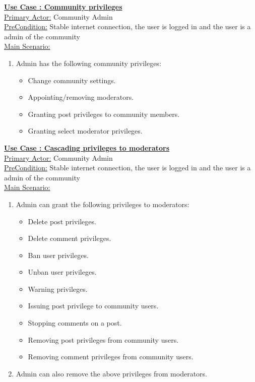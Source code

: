 \documentclass[conference,compsoc]{IEEEtran}
\newcounter{UC}
\newcommand{\nextU}{\stepcounter{UC}\theUC}
\begin{document}
\underline{\textbf{Use Case \nextU: Community privileges}}\\

\underline{Primary Actor:} Community Admin\\

\underline{PreCondition:} Stable internet connection, the user is logged in and the user is a admin of the community\\

\underline{Main Scenario:}\\
\begin{enumerate}
    \item Admin has the following community privileges:
          \begin{itemize}
              \item Change community settings.
              \item Appointing/removing moderators.
              \item Granting post privileges to community members.
              \item Granting select moderator privileges.
          \end{itemize}
\end{enumerate}

\underline{\textbf{Use Case \nextU: Cascading privileges to moderators}}\\

\underline{Primary Actor:} Community Admin\\

\underline{PreCondition:} Stable internet connection, the user is logged in and the user is a admin of the community\\

\underline{Main Scenario:}\\

\begin{enumerate}
    \item Admin can grant the following privileges to moderators:
          \begin{itemize}
              \item Delete post privileges.
              \item Delete comment privileges.
              \item Ban user privileges.
              \item Unban user privileges.
              \item Warning privileges.
              \item Issuing post privilege to community users.
              \item Stopping comments on a post.
              \item Removing post privileges from community users.
              \item Removing comment privileges from community users.
          \end{itemize}
    \item Admin can also remove the above privileges from moderators.
\end{enumerate}
\end{document}
